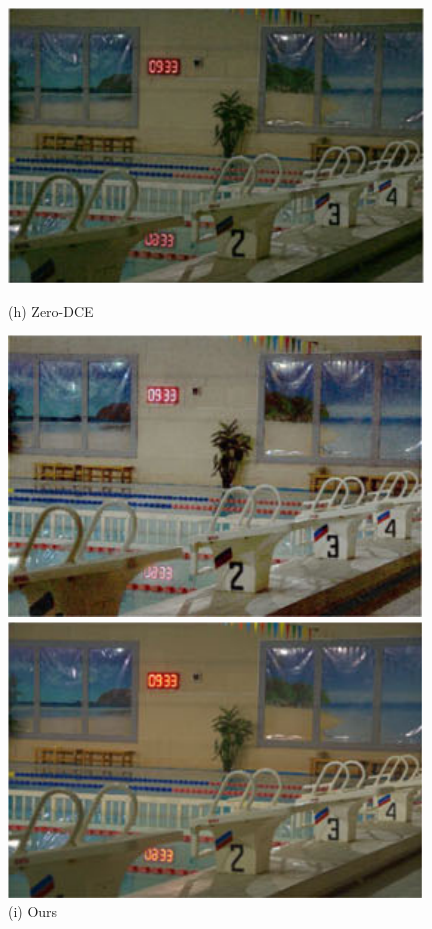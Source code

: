 \documentclass[CJK,aspectratio=169]{beamer}  %
\begin{document}
\begin{frame}
\begin{figure}
\begin{minipage}{0.19\textwidth}
			\includegraphics[width=\linewidth]{picture/LLIE/Efficent/Zero-DCE}
			\caption*{\tiny (h) Zero-DCE}
			\label{fig: Zero-DCE}	
		\end{minipage}
		\begin{minipage}{0.19\textwidth}
			\includegraphics[width=\linewidth]{picture/LLIE/Efficent/Ours}
			\caption*{\tiny (i) Ours}
			\label{fig: Ours}	
		\end{minipage}
		\begin{minipage}{0.19\textwidth}
			\includegraphics[width=\linewidth]{picture/LLIE/Efficent/GT}

\end{minipage}
\end{figure}
\end{frame}
\end{document}
